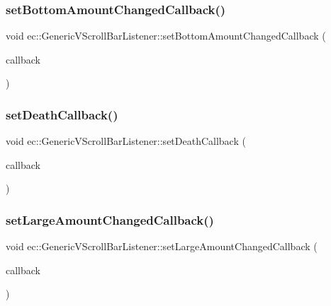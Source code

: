 \subsubsection{\texorpdfstring{set\+Bottom\+Amount\+Changed\+Callback()}{setBottomAmountChangedCallback()}}
{\footnotesize\ttfamily void ec\+::\+Generic\+V\+Scroll\+Bar\+Listener\+::set\+Bottom\+Amount\+Changed\+Callback (\begin{DoxyParamCaption}\item[{const \mbox{\hyperlink{classec_1_1_generic_v_scroll_bar_listener_abcc4e00e4c23a24981d7fc0a7538d00f}{Bottom\+Amount\+Changed\+\_\+\+Callback}} \&}]{callback }\end{DoxyParamCaption})}

\mbox{\label{classec_1_1_generic_v_scroll_bar_listener_a9284e4e6c9724920e7cbf340924bde0c}} 
\subsubsection{\texorpdfstring{set\+Death\+Callback()}{setDeathCallback()}}
{\footnotesize\ttfamily void ec\+::\+Generic\+V\+Scroll\+Bar\+Listener\+::set\+Death\+Callback (\begin{DoxyParamCaption}\item[{const \mbox{\hyperlink{classec_1_1_generic_v_scroll_bar_listener_a821b55a49a6b6324b98a66872b19a823}{Death\+\_\+\+Callback}} \&}]{callback }\end{DoxyParamCaption})}

\mbox{\label{classec_1_1_generic_v_scroll_bar_listener_a0f8b64bbe3300f3c609c5b59beccca4a}} 
\subsubsection{\texorpdfstring{set\+Large\+Amount\+Changed\+Callback()}{setLargeAmountChangedCallback()}}
{\footnotesize\ttfamily void ec\+::\+Generic\+V\+Scroll\+Bar\+Listener\+::set\+Large\+Amount\+Changed\+Callback (\begin{DoxyParamCaption}\item[{const \mbox{\hyperlink{classec_1_1_generic_v_scroll_bar_listener_ad3ca6f0d2092abe22a26f20e821c35b6}{Large\+Amount\+Changed\+\_\+\+Callback}} \&}]{callback }\end{DoxyParamCaption})}

